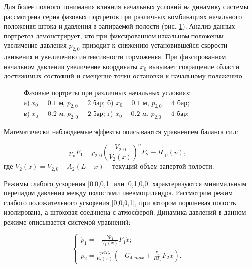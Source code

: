 Для более полного понимания влияния начальных условий на динамику системы рассмотрена серия фазовых
портретов при различных комбинациях начального положения штока и давления в запираемой
полости (рис. \ref{fig:pp_moderate_matrix}). Анализ данных портретов демонстрирует, что при
фиксированном начальном положении увеличение давления $p_{2,0}$ приводит к снижению установившейся скорости
движения и увеличению интенсивности торможения. При фиксированном начальном давлении
увеличение координаты $x_0$ вызывает сокращение области достижимых состояний и смещение точки остановки к начальному положению.

\begin{figure}[htbp]
	\caption{Фазовые портреты при различных начальных условиях: \\
		а) $x_0 = \num{0,1}$ м, $p_{2,0} = 2$ бар; б) $x_0 = \num{0.1}$ м, $p_{2,0} = 4$ бар; \\
		в) $x_0 = \num{0.2}$ м, $p_{2,0} = 2$ бар; г) $x_0 = \num{0.2}$ м, $p_{2,0} = 4$ бар;
	}
	\label{fig:pp_moderate_matrix}
\end{figure}

Математически наблюдаемые эффекты описываются уравнением баланса сил:

\begin{equation}
	p_\text{п}F_1 - p_{2,0}\left(\frac{V_{2,0}}{V_2(x)}\right)^nF_2 = R_\text{тр}(v),
\end{equation}
где $V_2(x) = V_{2,0} + A_2(L - x)$ -- текущий объем запертой полости.

Режимы слабого ускорения [0,0,0,1] или [0,1,0,0] характеризуются минимальным перепадом давлений между
полостями пневмоцилиндра. Рассмотрим режим слабого положительного ускорения [0,0,0,1], при котором поршневая полость
изолирована, а штоковая соединена с атмосферой. Динамика давлений в данном режиме описывается системой уравнений:

$$\begin{cases}
		\dot{p}_1 = -\frac{\gamma p_1}{V_1(x)}F_1\dot{x}; \\
		\dot{p}_2 = \frac{\gamma RT_2}{V_2(x)}(-G_{4,max} + \frac{p_2}{RT_2}F_2\dot{x}).
	\end{cases}$$

